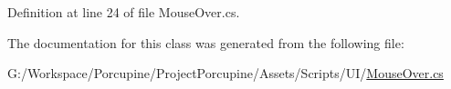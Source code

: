 Definition at line 24 of file Mouse\+Over.\+cs.



The documentation for this class was generated from the following file\+:\begin{DoxyCompactItemize}
\item 
G\+:/\+Workspace/\+Porcupine/\+Project\+Porcupine/\+Assets/\+Scripts/\+U\+I/\hyperlink{_mouse_over_8cs}{Mouse\+Over.\+cs}\end{DoxyCompactItemize}
